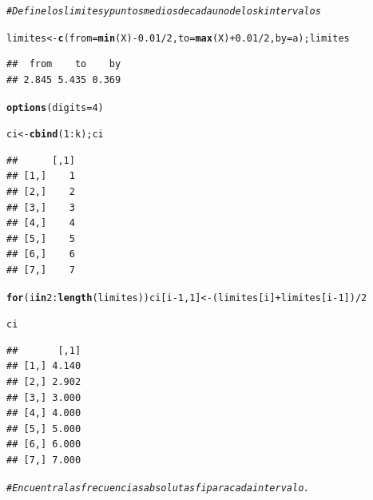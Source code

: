 \documentclass[12pt,letterpaper]{article}\usepackage[]{graphicx}\usepackage[]{color}
\makeatletter
\newcommand{\hlnum}[1]{\textcolor[rgb]{0.686,0.059,0.569}{#1}}%
\newcommand{\hlcom}[1]{\textcolor[rgb]{0.678,0.584,0.686}{\textit{#1}}}%
\newcommand{\hlopt}[1]{\textcolor[rgb]{0,0,0}{#1}}%
\newcommand{\hlstd}[1]{\textcolor[rgb]{0.345,0.345,0.345}{#1}}%
\newcommand{\hlkwa}[1]{\textcolor[rgb]{0.161,0.373,0.58}{\textbf{#1}}}%
\newcommand{\hlkwb}[1]{\textcolor[rgb]{0.69,0.353,0.396}{#1}}%
\newcommand{\hlkwc}[1]{\textcolor[rgb]{0.333,0.667,0.333}{#1}}%
\newcommand{\hlkwd}[1]{\textcolor[rgb]{0.737,0.353,0.396}{\textbf{#1}}}%
\newenvironment{kframe}{%
 \def\at@end@of@kframe{}%
 \ifinner\ifhmode%
  \def\at@end@of@kframe{\end{minipage}}%
  \begin{minipage}{\columnwidth}%
 \fi\fi%
 \def\FrameCommand##1{\hskip\@totalleftmargin \hskip-\fboxsep
 \colorbox{shadecolor}{##1}\hskip-\fboxsep
     \hskip-\linewidth \hskip-\@totalleftmargin \hskip\columnwidth}%
 \MakeFramed {\advance\hsize-\width
   \@totalleftmargin\z@ \linewidth\hsize
   \@setminipage}}%
 {\par\unskip\endMakeFramed%
 \at@end@of@kframe}
\newenvironment{knitrout}{}{} %
\makeatother
\begin{document}
\begin{enumerate}
\begin{knitrout}
\color{fgcolor}\begin{kframe}
\begin{alltt}
\hlcom{# Define los limites y puntos mediosde cada uno de los k intervalos}

\hlstd{limites} \hlkwb{<-} \hlkwd{c}\hlstd{(}\hlkwc{from} \hlstd{=} \hlkwd{min}\hlstd{(X)}\hlopt{-}\hlnum{0.01}\hlopt{/}\hlnum{2}\hlstd{,} \hlkwc{to} \hlstd{=} \hlkwd{max}\hlstd{(X)}\hlopt{+}\hlnum{0.01}\hlopt{/}\hlnum{2}\hlstd{,} \hlkwc{by}\hlstd{=a); limites}
\end{alltt}
\begin{verbatim}
##  from    to    by 
## 2.845 5.435 0.369
\end{verbatim}
\begin{alltt}
\hlkwd{options}\hlstd{(}\hlkwc{digits}\hlstd{=}\hlnum{4}\hlstd{)}
\end{alltt}
\end{kframe}
\end{knitrout}

\begin{knitrout}
\color{fgcolor}\begin{kframe}
\begin{alltt}
\hlstd{ci} \hlkwb{<-} \hlkwd{cbind}\hlstd{(}\hlnum{1}\hlopt{:}\hlstd{k); ci}
\end{alltt}
\begin{verbatim}
##      [,1]
## [1,]    1
## [2,]    2
## [3,]    3
## [4,]    4
## [5,]    5
## [6,]    6
## [7,]    7
\end{verbatim}
\begin{alltt}
\hlkwa{for}\hlstd{(i} \hlkwa{in} \hlnum{2}\hlopt{:}\hlkwd{length}\hlstd{(limites)) ci[i}\hlopt{-}\hlnum{1}\hlstd{,} \hlnum{1}\hlstd{]} \hlkwb{<-} \hlstd{(limites[i]}\hlopt{+} \hlstd{limites[i}\hlopt{-}\hlnum{1}\hlstd{])}\hlopt{/}\hlnum{2}

\hlstd{ci}
\end{alltt}
\begin{verbatim}
##       [,1]
## [1,] 4.140
## [2,] 2.902
## [3,] 3.000
## [4,] 4.000
## [5,] 5.000
## [6,] 6.000
## [7,] 7.000
\end{verbatim}
\end{kframe}
\end{knitrout}

\begin{knitrout}
\color{fgcolor}\begin{kframe}
\begin{alltt}
\hlcom{# Encuentra las frecuencias absolutas fi para cada intervalo.}


\end{alltt}
\end{kframe}
\end{knitrout}
\end{enumerate}
\end{document}
